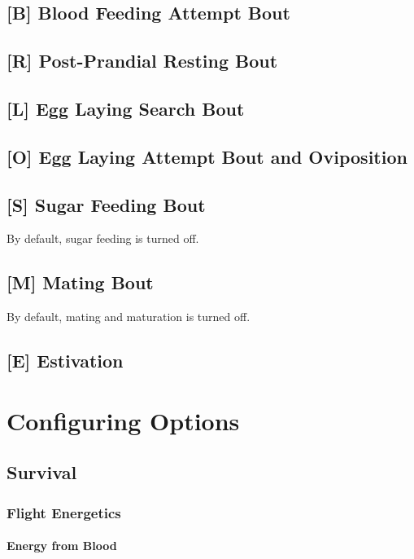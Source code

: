 \documentclass{article}
\begin{document}
\subsection*{[B] Blood Feeding Attempt Bout}

\subsection*{[R] Post-Prandial Resting Bout}

\subsection*{[L] Egg Laying Search Bout}

\subsection*{[O] Egg Laying Attempt Bout and Oviposition}

\subsection*{[S] Sugar Feeding Bout}

By default, sugar feeding is turned off. 

\subsection*{[M] Mating Bout}

By default, mating and maturation is turned off. 

\subsection*{[E] Estivation}

\section{Configuring Options}

\subsection{Survival}

\subsubsection{Flight Energetics}

\paragraph{Energy from Blood}
\end{document}
